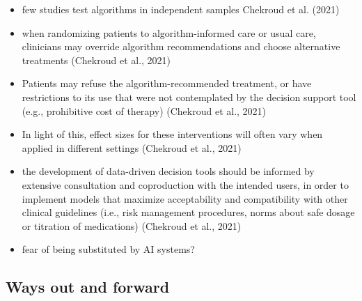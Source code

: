 \documentclass[
  man]{apa7}
\providecommand{\tightlist}{%
  \setlength{\itemsep}{0pt}\setlength{\parskip}{0pt}}
\begin{document}
\begin{itemize}
\tightlist
\item
  few studies test algorithms in independent samples Chekroud et al. (2021)
\item
  when randomizing patients to algorithm-informed care or usual care, clinicians may override algorithm recommendations and choose alternative treatments (Chekroud et al., 2021)
\item
  Patients may refuse the algorithm-recommended treatment, or have restrictions to its use that were not contemplated by the decision support tool (e.g., prohibitive cost of therapy) (Chekroud et al., 2021)
\item
  In light of this, effect sizes for these interventions will often vary when applied in different settings (Chekroud et al., 2021)
\item
  the development of data-driven decision tools should be informed by extensive consultation and coproduction with the intended users, in order to implement models that maximize acceptability and compatibility with other clinical guidelines (i.e., risk management procedures, norms about safe dosage or titration of medications) (Chekroud et al., 2021)
\item
  fear of being substituted by AI systems?
\end{itemize}

\hypertarget{ways-out-and-forward}{%
\subsection{Ways out and forward}\label{ways-out-and-forward}}
\end{document}
